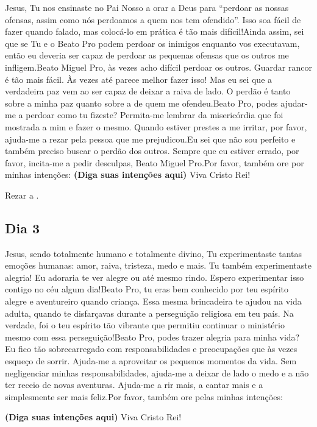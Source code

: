 \documentclass[a4paper,14pt,twoside]{extarticle} \usepackage[utf8]{inputenc}
\begin{document}
Jesus, Tu nos ensinaste no Pai Nosso a orar a Deus para “perdoar as nossas ofensas, assim como nós perdoamos a quem nos tem ofendido”. Isso soa fácil de fazer quando falado, mas colocá-lo em prática é tão mais difícil!Ainda assim, sei que se Tu e o Beato Pro podem perdoar os inimigos enquanto vos executavam, então eu deveria ser capaz de perdoar as pequenas ofensas que os outros me infligem.Beato Miguel Pro, às vezes acho difícil perdoar os outros. Guardar rancor é tão mais fácil. Às vezes até parece melhor fazer isso! Mas eu sei que a verdadeira paz vem ao ser capaz de deixar a raiva de lado. O perdão é tanto sobre a minha paz quanto sobre a de quem me ofendeu.Beato Pro, podes ajudar-me a perdoar como tu fizeste? Permita-me lembrar da misericórdia que foi mostrada a mim e fazer o mesmo. Quando estiver prestes a me irritar, por favor, ajuda-me a rezar pela pessoa que me prejudicou.Eu sei que não sou perfeito e também preciso buscar o perdão dos outros. Sempre que eu estiver errado, por favor, incita-me a pedir desculpas, Beato Miguel Pro.Por favor, também ore por minhas intenções: \textbf{(Diga suas intenções aqui)} Viva Cristo Rei!

Rezar a \textbf{}.

\subsection{Dia 3}


Jesus, sendo totalmente humano e totalmente divino, Tu experimentaste tantas
emoções humanas: amor, raiva, tristeza, medo e mais. Tu também experimentaste
alegria! Eu adoraria te ver alegre ou até mesmo rindo. Espero experimentar isso
contigo no céu algum dia!Beato Pro, tu eras bem conhecido por teu espírito
alegre e aventureiro quando criança. Essa mesma brincadeira te ajudou na vida
adulta, quando te disfarçavas durante a perseguição religiosa em teu país. Na
verdade, foi o teu espírito tão vibrante que permitiu continuar o ministério
mesmo com essa perseguição!Beato Pro, podes trazer alegria para minha vida? Eu
fico tão sobrecarregado com responsabilidades e preocupações que às vezes
esqueço de sorrir. Ajuda-me a aproveitar os pequenos momentos da vida. Sem
negligenciar minhas responsabilidades, ajuda-me a deixar de lado o medo e a não
ter receio de novas aventuras. Ajuda-me a rir mais, a cantar mais e a
simplesmente ser mais feliz.Por favor, também ore pelas minhas intenções:

\textbf{(Diga suas intenções aqui)} Viva Cristo Rei!
\end{document}
